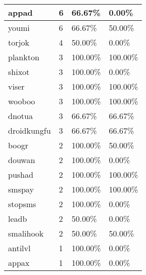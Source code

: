\begin{table}[]
\begin{tabular}{|l|l|l|l|}
appad                   & 6                & 66.67\%               & 0.00\%                     \\ \hline
youmi                   & 6                & 66.67\%               & 50.00\%                    \\ \hline
torjok                  & 4                & 50.00\%               & 0.00\%                     \\ \hline
plankton                & 3                & 100.00\%              & 100.00\%                   \\ \hline
shixot                  & 3                & 100.00\%              & 0.00\%                     \\ \hline
viser                   & 3                & 100.00\%              & 100.00\%                   \\ \hline
wooboo                  & 3                & 100.00\%              & 100.00\%                   \\ \hline
dnotua                  & 3                & 66.67\%               & 66.67\%                    \\ \hline
droidkungfu             & 3                & 66.67\%               & 66.67\%                    \\ \hline
boogr                   & 2                & 100.00\%              & 50.00\%                    \\ \hline
douwan                  & 2                & 100.00\%              & 0.00\%                     \\ \hline
pushad                  & 2                & 100.00\%              & 100.00\%                   \\ \hline
smspay                  & 2                & 100.00\%              & 100.00\%                   \\ \hline
stopsms                 & 2                & 100.00\%              & 0.00\%                     \\ \hline
leadb                   & 2                & 50.00\%               & 0.00\%                     \\ \hline
smalihook               & 2                & 50.00\%               & 50.00\%                    \\ \hline
antilvl                 & 1                & 100.00\%              & 0.00\%                     \\ \hline
appax                   & 1                & 100.00\%              & 0.00\%                     \\ \hline

\end{tabular}
\end{table}
